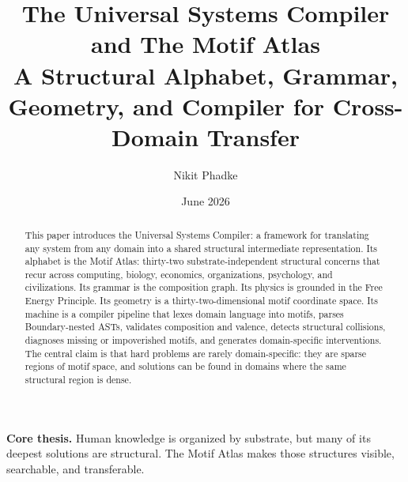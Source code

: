\documentclass[11pt,a4paper]{article}
\title{\vspace{-2.2em}\Huge\textbf{The Universal Systems Compiler\\[-0.05em]\Large and The Motif Atlas}\\[0.55em]
\large A Structural Alphabet, Grammar, Geometry, and Compiler for Cross-Domain Transfer}
\author{\Large Nikit Phadke}
\date{June 2026}
\newcommand{\motif}[1]{\textbf{\textcolor{atlasblue}{#1}}}
\begin{document}
\maketitle
\thispagestyle{empty}

\begin{center}
\end{center}

\begin{abstract}
This paper introduces the Universal Systems Compiler: a framework for translating any system from any domain into a shared structural intermediate representation. Its alphabet is the Motif Atlas: thirty-two substrate-independent structural concerns that recur across computing, biology, economics, organizations, psychology, and civilizations. Its grammar is the composition graph. Its physics is grounded in the Free Energy Principle. Its geometry is a thirty-two-dimensional motif coordinate space. Its machine is a compiler pipeline that lexes domain language into motifs, parses Boundary-nested ASTs, validates composition and valence, detects structural collisions, diagnoses missing or impoverished motifs, and generates domain-specific interventions. The central claim is that hard problems are rarely domain-specific: they are sparse regions of motif space, and solutions can be found in domains where the same structural region is dense.
\end{abstract}

\begin{thesisbox}
\textbf{Core thesis.} Human knowledge is organized by substrate, but many of its deepest solutions are structural. The Motif Atlas makes those structures visible, searchable, and transferable.
\end{thesisbox}
\end{document}
